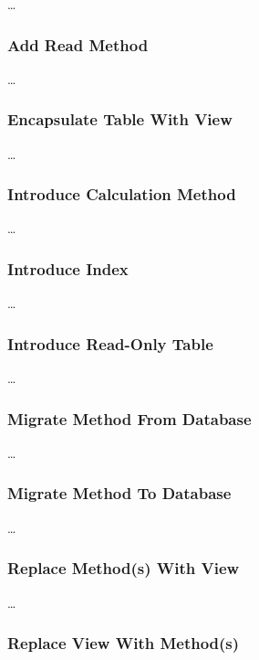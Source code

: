 \documentclass{acm_proc_article-sp}
\begin{document}
\ldots

\subsubsection{Add Read Method}

\ldots

\subsubsection{Encapsulate Table With View}

\ldots

\subsubsection{Introduce Calculation Method}

\ldots

\subsubsection{Introduce Index}

\ldots

\subsubsection{Introduce Read-Only Table}

\ldots

\subsubsection{Migrate Method From Database}

\ldots

\subsubsection{Migrate Method To Database}

\ldots

\subsubsection{Replace Method(s) With View}

\ldots

\subsubsection{Replace View With Method(s)}
\end{document}
